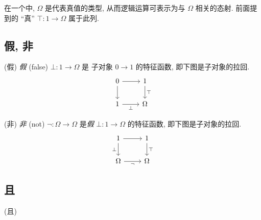 在一个\topos{}中, $\Omega$ 是代表真值的类型, 从而逻辑运算可表示为与 $\Omega$ 相关的态射. 前面提到的 ``真'' $\top \colon 1 \to \Omega$ 属于此列.

\subsection{假, 非}

\begin{definition}
	{(假)}
	\emph{假} (false) $\bot \colon 1 \to \Omega$ 是 子对象 $0\to 1$ 的特征函数, 即下图是子对象的拉回.
	\[\begin{tikzcd}[ampersand replacement=\&]
		0 \& 1 \\
		1 \& \Omega
		\arrow[from=1-1, to=2-1]
		\arrow[from=1-1, to=1-2]
		\arrow["\bot"', from=2-1, to=2-2]
		\arrow["\top", from=1-2, to=2-2]
	\end{tikzcd}\]
\end{definition}

\begin{definition}
	{(非)}
	\emph{非} (not) $\neg\colon \Omega\to\Omega$ 是\emph{假} $\bot\colon 1 \to\Omega$ 的特征函数, 即下图是子对象的拉回.
	\[\begin{tikzcd}[ampersand replacement=\&]
		1 \& 1 \\
		\Omega \& \Omega
		\arrow["\bot"', from=1-1, to=2-1]
		\arrow[from=1-1, to=1-2]
		\arrow["\neg"', from=2-1, to=2-2]
		\arrow["\top", from=1-2, to=2-2]
	\end{tikzcd}\]
\end{definition}

\subsection{且}

\begin{definition}
	{(且)}
	
\end{definition}












